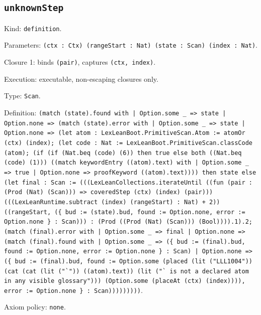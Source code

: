 \documentclass[11pt]{article}
\begin{document}
\subsection*{\texttt{unknownStep}}
\noindent Kind: \texttt{definition}.\par
\noindent Parameters: \texttt{(ctx : Ctx) (rangeStart : Nat) (state : Scan) (index : Nat)}.\par
\noindent Closure 1: binds \texttt{(pair)}, captures \texttt{(ctx, index)}.\par
\noindent Execution: executable, non-escaping closures only.\par
\noindent Type: \texttt{Scan}.\par
\noindent Definition: \texttt{(match (state).found with | Option.some \_ => state | Option.none => (match (state).error with | Option.some \_ => state | Option.none => (let atom : LexLeanBoot.PrimitiveScan.Atom := atomOr (ctx) (index); (let code : Nat := LexLeanBoot.PrimitiveScan.classCode (atom); (if (if (Nat.beq (code) (6)) then true else both ((Nat.beq (code) (1))) ((match keywordEntry ((atom).text) with | Option.some \_ => true | Option.none => proofKeyword ((atom).text)))) then state else (let final : Scan := (((LexLeanCollections.iterateUntil ((fun (pair : (Prod (Nat) (Scan))) => coveredStep (ctx) (index) (pair))) (((LexLeanRuntime.subtract (index) (rangeStart) : Nat) + 2)) ((rangeStart, (\{ bud := (state).bud, found := Option.none, error := Option.none \} : Scan))) : (Prod ((Prod (Nat) (Scan))) (Bool)))).1).2; (match (final).error with | Option.some \_ => final | Option.none => (match (final).found with | Option.some \_ => (\{ bud := (final).bud, found := Option.none, error := Option.none \} : Scan) | Option.none => (\{ bud := (final).bud, found := Option.some (placed (lit ("LLL1004")) (cat (cat (lit ("`")) ((atom).text)) (lit ("` is not a declared atom in any visible glossary"))) (Option.some (placeAt (ctx) (index)))), error := Option.none \} : Scan)))))))))}.\par
\noindent Axiom policy: \texttt{none}.\par
\end{document}

